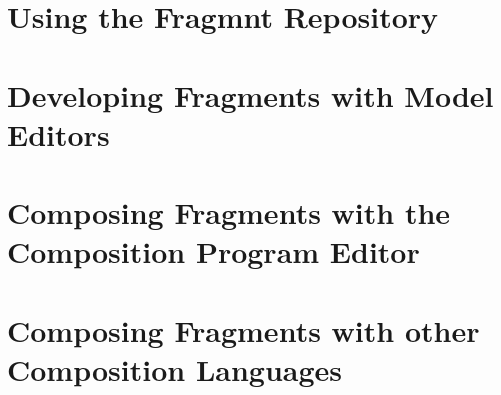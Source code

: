 \section{Using the Fragmnt Repository}


\section{Developing Fragments with Model Editors}


\section{Composing Fragments with the Composition Program Editor}


\section{Composing Fragments with other Composition Languages}